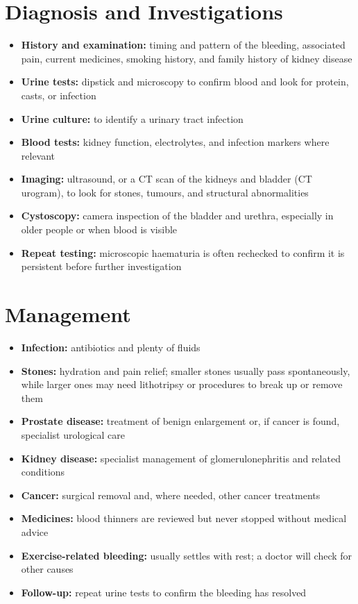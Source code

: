 \section*{Diagnosis and Investigations}
\begin{itemize}
    \item \textbf{History and examination:} timing and pattern of the bleeding, associated pain, current medicines, smoking history, and family history of kidney disease
    \item \textbf{Urine tests:} dipstick and microscopy to confirm blood and look for protein, casts, or infection
    \item \textbf{Urine culture:} to identify a urinary tract infection
    \item \textbf{Blood tests:} kidney function, electrolytes, and infection markers where relevant
    \item \textbf{Imaging:} ultrasound, or a CT scan of the kidneys and bladder (CT urogram), to look for stones, tumours, and structural abnormalities
    \item \textbf{Cystoscopy:} camera inspection of the bladder and urethra, especially in older people or when blood is visible
    \item \textbf{Repeat testing:} microscopic haematuria is often rechecked to confirm it is persistent before further investigation
\end{itemize}

\section*{Management}
\begin{itemize}
    \item \textbf{Infection:} antibiotics and plenty of fluids
    \item \textbf{Stones:} hydration and pain relief; smaller stones usually pass spontaneously, while larger ones may need lithotripsy or procedures to break up or remove them
    \item \textbf{Prostate disease:} treatment of benign enlargement or, if cancer is found, specialist urological care
    \item \textbf{Kidney disease:} specialist management of glomerulonephritis and related conditions
    \item \textbf{Cancer:} surgical removal and, where needed, other cancer treatments
    \item \textbf{Medicines:} blood thinners are reviewed but never stopped without medical advice
    \item \textbf{Exercise-related bleeding:} usually settles with rest; a doctor will check for other causes
    \item \textbf{Follow-up:} repeat urine tests to confirm the bleeding has resolved
\end{itemize}

